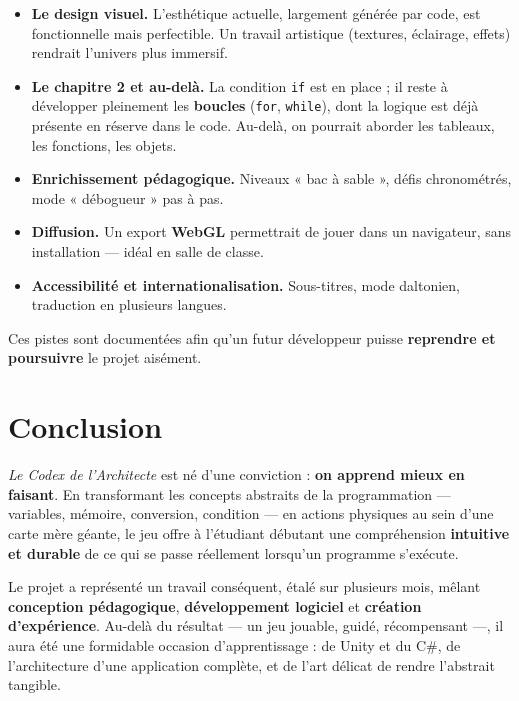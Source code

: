\documentclass[12pt,a4paper]{article}
\begin{document}
\begin{itemize}[leftmargin=1.4em]
  \item \textbf{Le design visuel.} L'esthétique actuelle, largement générée par
  code, est fonctionnelle mais perfectible. Un travail artistique (textures,
  éclairage, effets) rendrait l'univers plus immersif.
  \item \textbf{Le chapitre 2 et au-delà.} La condition \texttt{if} est en place ;
  il reste à développer pleinement les \textbf{boucles} (\texttt{for},
  \texttt{while}), dont la logique est déjà présente en réserve dans le code.
  Au-delà, on pourrait aborder les tableaux, les fonctions, les objets.
  \item \textbf{Enrichissement pédagogique.} Niveaux « bac à sable », défis
  chronométrés, mode « débogueur » pas à pas.
  \item \textbf{Diffusion.} Un export \textbf{WebGL} permettrait de jouer dans un
  navigateur, sans installation — idéal en salle de classe.
  \item \textbf{Accessibilité et internationalisation.} Sous-titres, mode
  daltonien, traduction en plusieurs langues.
\end{itemize}

Ces pistes sont documentées afin qu'un futur développeur puisse \textbf{reprendre
et poursuivre} le projet aisément.

\section{Conclusion}

\emph{Le Codex de l'Architecte} est né d'une conviction : \textbf{on apprend mieux
en faisant}. En transformant les concepts abstraits de la programmation —
variables, mémoire, conversion, condition — en actions physiques au sein d'une
carte mère géante, le jeu offre à l'étudiant débutant une compréhension
\textbf{intuitive et durable} de ce qui se passe réellement lorsqu'un programme
s'exécute.

Le projet a représenté un travail conséquent, étalé sur plusieurs mois, mêlant
\textbf{conception pédagogique}, \textbf{développement logiciel} et
\textbf{création d'expérience}. Au-delà du résultat — un jeu jouable, guidé,
récompensant —, il aura été une formidable occasion d'apprentissage : de Unity et
du C\#, de l'architecture d'une application complète, et de l'art délicat de
rendre l'abstrait tangible.
\end{document}
